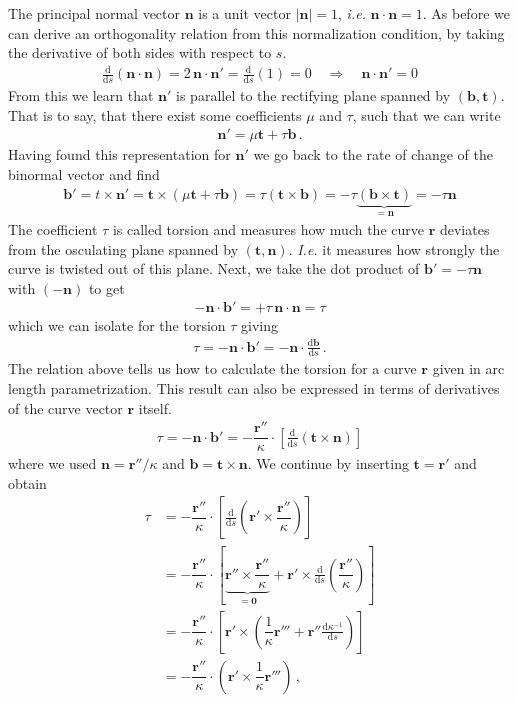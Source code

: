 \documentclass[11pt, DINA4, fleqn]{amsart}
\def\df{\mathrm{d}\xspace}
\newcommand{\dd}[2]{\frac{\df#1}{\df#2}}
\def\vr{\boldsymbol{r}\xspace}
\def\vt{\boldsymbol{t}\xspace}
\def\vn{\boldsymbol{n}\xspace}
\def\vb{\boldsymbol{b}\xspace}
\begin{document}
The principal normal vector $\vn$ is a unit vector $|\vn| = 1$, \textit{i.e.} $\vn \cdot \vn = 1$.
As before we can derive an orthogonality relation from this normalization condition, by taking the derivative of both sides with respect to $s$.
\begin{align}
\dd{}{s}(\vn\cdot\vn)  = 2\, \vn\cdot\vn'= \dd{}{s}(1) = 0 \quad \Longrightarrow \quad \vn \cdot \vn' = 0
\end{align}
From this we learn that $\vn'$ is parallel to the rectifying plane spanned by $(\vb, \vt)$.
That is to say, that there exist some coefficients $\mu$ and $\tau$, such that we can write
\begin{align}
\vn' =\mu\vt + \tau \vb \, .
\label{eq:nprimeExp}
\end{align}
Having found this representation for $\vn'$ we go back to the rate of change of the binormal vector and find
\begin{align}
\vb' = t\times \vn' = \vt \times \left(\mu \vt + \tau \vb\right) = \tau \left(\vt \times \vb\right) = - \tau \underbrace{\left(\vb\times \vt\right)}_{=\vn}
= -\tau\vn
\label{eq:bprimeExp}
\end{align}
The coefficient $\tau$ is called torsion and measures how much the curve $\vr$ deviates from the osculating plane spanned by $(\vt, \vn)$.
\textit{I.e.} it measures how strongly the curve is twisted out of this plane.
Next, we take the dot product of $\vb' = -\tau\vn$ with $(-\vn)$ to get
\begin{align}
-\vn \cdot \vb' = + \tau\, \vn \cdot \vn =\tau
\end{align}
which we can isolate for the torsion $\tau$ giving 
\begin{align}
\tau = -\vn \cdot \vb' = -\vn \cdot \dd{\vb}{s} \, .
\end{align}
The relation above tells us how to calculate the torsion for a curve $\vr$ given in arc length parametrization.
This result can also be expressed in terms of derivatives of the curve vector $\vr$ itself.
\begin{align}
\tau = - \vn \cdot \vb' = -\dfrac{\vr''}{\kappa} \cdot \left[\dd{}{s}\left(\vt \times \vn\right)\right]
\end{align}
where we used $\vn = \vr'' /\kappa$  and $\vb = \vt \times \vn$. We continue by inserting $\vt = \vr'$ and obtain
\begin{align}
\tau &= -\dfrac{\vr''}{\kappa} \cdot \left[\dd{}{s}\left(\vr' \times \dfrac{\vr''}{\kappa}\right)\right] \\
&= -\dfrac{\vr''}{\kappa} \cdot \left[
\underbrace{\vr'' \times \dfrac{\vr''}{\kappa}}_{=\boldsymbol{0}} + \vr' \times \dd{}{s}\left(\dfrac{\vr''}{\kappa}\right)
\right] \\
&= -\dfrac{\vr''}{\kappa} \cdot \left[
\vr' \times \left(
\dfrac{1}{\kappa}\vr''' + \vr'' \dd{\kappa^{-1}}{s}
\right)
\right] \\
&= -\dfrac{\vr''}{\kappa} \cdot\left(
\vr' \times \dfrac{1}{\kappa} \vr'''
\right) \, ,
\end{align}
\end{document}
